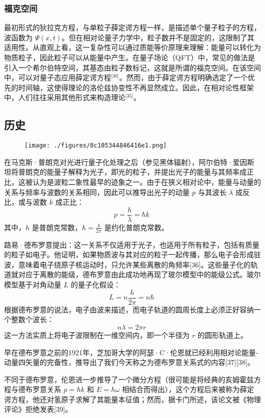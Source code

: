 \subsubsection{福克空间}
最初形式的狄拉克方程，与单粒子薛定谔方程一样，是描述单个量子粒子的方程，波函数为 $\Psi(x, t)$。但在相对论量子力学中，粒子数并不是固定的，这限制了其适用性。从直观上看，这一复杂性可以通过质能等价原理来理解：能量可以转化为物质粒子，因此粒子可以从能量中产生。在量子场论（QFT）中，常见的做法是引入一个希尔伯特空间，其基态由粒子数标记，这就是所谓的福克空间。在该空间中，可以对量子态应用薛定谔方程\(^\text{[30]}\)。然而，由于薛定谔方程明确选定了一个优先的时间轴，这使得理论的洛伦兹协变性不再显然成立。因此，在相对论性框架中，人们往往采用其他形式来构造理论\(^\text{[35]}\)。
\subsection{历史}
\begin{figure}[ht]
\centering
\texttt{[image: ./figures/0c105344846416e1.png]}
\caption{} \label{fig_XDEfc_6}
\end{figure}
在马克斯·普朗克对光进行量子化处理之后（参见黑体辐射），阿尔伯特·爱因斯坦将普朗克的能量子解释为光子，即光的粒子，并提出光子的能量与其频率成正比，这被认为是波粒二象性最早的迹象之一。由于在狭义相对论中，能量与动量的关系与频率与波数的关系相同，因此可以推导出光子的动量 $p$ 与其波长 $\lambda$ 成反比，或与波数 $k$ 成正比：
$$
p = \frac{h}{\lambda} = \hbar k~
$$
其中，$h$ 是普朗克常数，$\hbar = \frac{h}{2\pi}$ 是约化普朗克常数。

路易·德布罗意提出：这一关系不仅适用于光子，也适用于所有粒子，包括有质量的粒子如电子。他证明，如果物质波与其对应的粒子一起传播，那么电子会形成驻波，意味着电子绕原子核运动时，只允许某些离散的角频率[36]。这些量子化的轨道就对应于离散的能级，德布罗意由此成功地再现了玻尔模型中的能级公式。玻尔模型基于对角动量 $L$ 的量子化假设：
$$
L = n \frac{h}{2\pi} = n\hbar~
$$
根据德布罗意的说法，电子由波来描述，而电子轨道的圆周长度上必须正好容纳一个整数个波长：
$$
n\lambda = 2\pi r~
$$
这一方法实质上将电子波限制在一维空间内，即一个半径为 $r$ 的圆形轨道上。

早在德布罗意之前的1921年，芝加哥大学的阿瑟·C·伦恩就已经利用相对论能量-动量四矢量的完备性，推导出了我们今天称之为德布罗意关系式的内容[37][38]。

不同于德布罗意，伦恩进一步推导了一个微分方程（很可能是将经典的亥姆霍兹方程与德布罗意关系
$p = \hbar k$ 和 $E = \hbar \omega$ 相结合而得出），这个方程后来被称为薛定谔方程，他还对氢原子求解了其能量本征值；然而，据卡门所述，该论文被《物理评论》拒绝发表[39]。

